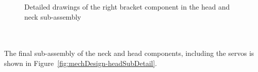         \begin{figure}[h!]
        \centering
        \caption[Detailed drawings of the right bracket component in the head and neck sub-assembly]{Detailed drawings of the right bracket component in the head and neck sub-assembly}
        \label{fig:mechDesign-headRightBracket}
        \end{figure}

      \\\\
        The final sub-assembly of the neck and head components, including the servos is shown in Figure~\ref{fig:mechDesign-headSubDetail}.
        
